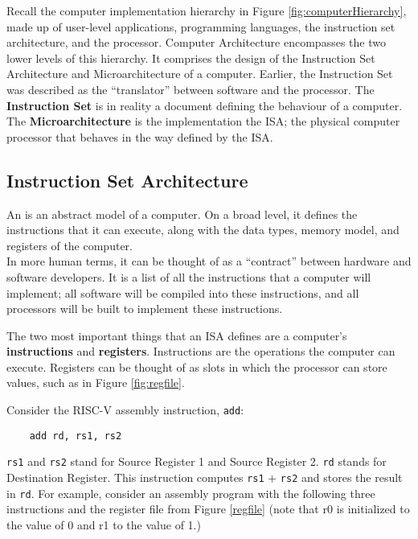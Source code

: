 
Recall the computer implementation hierarchy in Figure \ref{fig:computerHierarchy}, made up of user-level applications, programming languages, the instruction set architecture, and the processor. Computer Architecture encompasses the two lower levels of this hierarchy. It comprises the design of the Instruction Set Architecture and Microarchitecture of a computer. Earlier, the Instruction Set was described as the ``translator'' between software and the processor. The \textbf{Instruction Set} is in reality a document defining the behaviour of a computer. The \textbf{Microarchitecture} is the implementation the \gls{ISA}; the physical computer processor that behaves in the way defined by the \gls{ISA}.



\subsection{Instruction Set Architecture}
    An  is an abstract model of a computer. On a broad level, it defines the instructions that it can execute, along with the data types, memory model, and registers of the computer. \\
    In more human terms, it can be thought of as a ``contract'' between hardware and software developers. It is a list of all the instructions that a computer will implement; all software will be compiled into these instructions, and all processors will be built to implement these instructions.

    

    The two most important things that an \gls{ISA} defines are a computer's \textbf{instructions} and \textbf{registers}.
    Instructions are the operations the computer can execute. Registers can be thought of as slots in which the processor can store values, such as in Figure \ref{fig:regfile}. 

    

    \noindent Consider the RISC-V assembly instruction, \texttt{add}: 
    \begin{verbatim}
    add rd, rs1, rs2
    \end{verbatim}

    \noindent\texttt{rs1} and \texttt{rs2} stand for Source Register 1 and Source Register 2. \texttt{rd} stands for Destination Register. This instruction computes \texttt{rs1} $+$ \texttt{rs2} and stores the result in \texttt{rd}. For example, consider an assembly program with the following three instructions and the register file from Figure \ref{regfile} (note that r0 is initialized to the value of 0 and r1 to the value of 1.)

